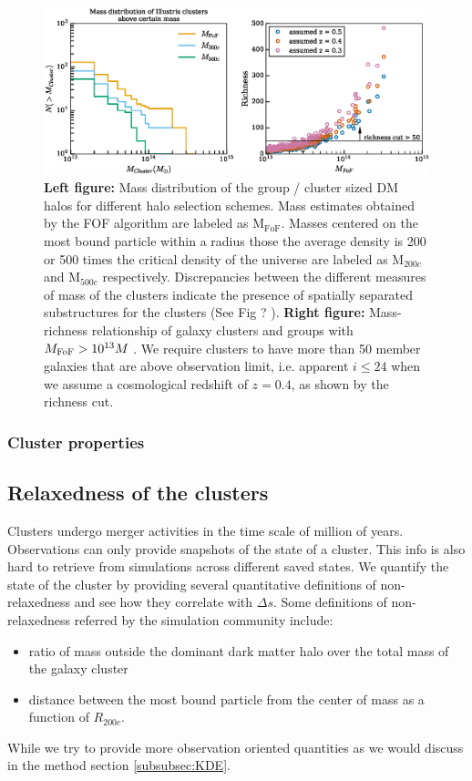 \begin{figure}
	\includegraphics[width=\linewidth]{./figures/finalized/clusterMassDist.eps}
	\caption{ {\bf Left figure:} Mass distribution of the group / cluster sized 
		DM halos for different halo selection schemes. Mass estimates obtained by the
		FOF algorithm are labeled as  M$_{\text{FoF}}$.
		Masses centered on the most bound particle within a radius those the 
		average density is 200 or 500 times the critical density of the universe are 
		labeled as M$_{200c}$ and M$_{500c}$ respectively. 
		Discrepancies between the different
		measures of mass of the clusters indicate the presence of spatially
		separated substructures for the clusters (See Fig ? ). {\bf Right figure:} 
		Mass-richness relationship of galaxy clusters and groups with 
		$M_{\rm FoF} > 10^{13} M_{}$ . We require clusters to have more than 50 member 
		galaxies that are above observation limit, i.e. apparent $i \leq 24$ when 
		we assume a cosmological redshift
of $z=0.4$, as shown by the richness cut. \label{fig:mass_richness}}


\end{figure}


\subsubsection{Cluster properties}
\label{subsubsec:cluster_properties}

\subsection{Relaxedness of the clusters}

Clusters undergo merger activities in the time scale of million of years. 
Observations can only provide snapshots of the state of a cluster. 
This info is also hard to retrieve from simulations across different saved
states.
We quantify the state of the cluster by providing several quantitative
definitions of non-relaxedness and see how they correlate with $\Delta s$.
Some definitions of non-relaxedness referred by the simulation community
include:
\begin{itemize}
	\item ratio of mass outside the dominant dark matter halo over the total mass
		of the galaxy cluster 
	\item distance between the most bound particle from the center of mass as a
		function of $R_{200c}$.
\end{itemize}
While we try to provide more observation oriented quantities as we would
discuss in the method section \ref{subsubsec:KDE}. 


